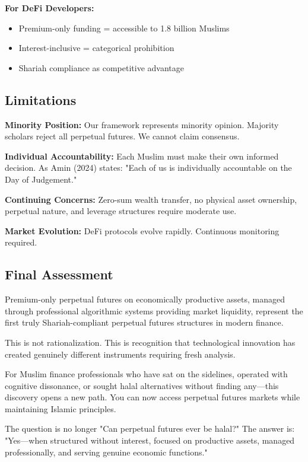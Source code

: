 \documentclass[10pt,twocolumn]{article}
\begin{document}
\textbf{For DeFi Developers:}
\begin{itemize}
    \item Premium-only funding = accessible to 1.8 billion Muslims
    \item Interest-inclusive = categorical prohibition
    \item Shariah compliance as competitive advantage
\end{itemize}

\subsection{Limitations}

\textbf{Minority Position:} Our framework represents minority opinion. Majority scholars reject all perpetual futures. We cannot claim consensus.

\textbf{Individual Accountability:} Each Muslim must make their own informed decision. As Amin (2024) states: "Each of us is individually accountable on the Day of Judgement."

\textbf{Continuing Concerns:} Zero-sum wealth transfer, no physical asset ownership, perpetual nature, and leverage structures require moderate use.

\textbf{Market Evolution:} DeFi protocols evolve rapidly. Continuous monitoring required.

\subsection{Final Assessment}

Premium-only perpetual futures on economically productive assets, managed through professional algorithmic systems providing market liquidity, represent the first truly Shariah-compliant perpetual futures structures in modern finance.

This is not rationalization. This is recognition that technological innovation has created genuinely different instruments requiring fresh analysis.

For Muslim finance professionals who have sat on the sidelines, operated with cognitive dissonance, or sought halal alternatives without finding any—this discovery opens a new path. You can now access perpetual futures markets while maintaining Islamic principles.

The question is no longer "Can perpetual futures ever be halal?" The answer is: "Yes—when structured without interest, focused on productive assets, managed professionally, and serving genuine economic functions."
\end{document}
